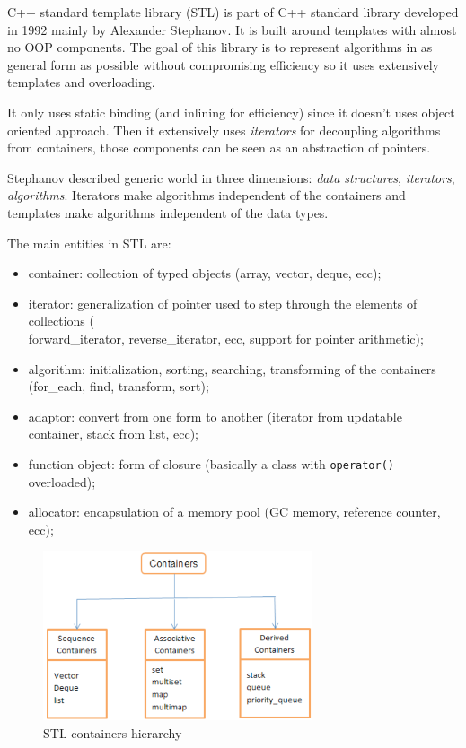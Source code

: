 C++ standard template library (STL) is part of C++ standard library developed in 1992 mainly by Alexander Stephanov.
It is built around templates with almost no OOP components.
The goal of this library is to represent algorithms in as general form as possible without compromising efficiency so it uses extensively templates and overloading.

It only uses static binding (and inlining for efficiency) since it doesn't uses object oriented approach.
Then it extensively uses \emph{iterators} for decoupling algorithms from containers, those components can be seen as an abstraction of pointers.

Stephanov described generic world in three dimensions: \emph{data structures}, \emph{iterators}, \emph{algorithms}.
Iterators make algorithms independent of the containers and templates make algorithms independent of the data types.

The main entities in STL are:
\begin{itemize}
    \item container: collection of typed objects (array, vector, deque, ecc);
    \item iterator: generalization of pointer used to step through the elements of collections (\\forward\_iterator, reverse\_iterator, ecc, support for pointer arithmetic);
    \item algorithm: initialization, sorting, searching, transforming of the containers (for\_each, find, transform, sort);
    \item adaptor: convert from one form to another (iterator from updatable container, stack from list, ecc);
    \item function object: form of closure (basically a class with \verb|operator()| overloaded);
    \item allocator: encapsulation of a memory pool (GC memory, reference counter, ecc);
\end{itemize}

\begin{figure}[H]
    \centering
    \includegraphics[width=300px]{images/6_STL/stl.png}
    \caption{STL containers hierarchy}
\end{figure}

